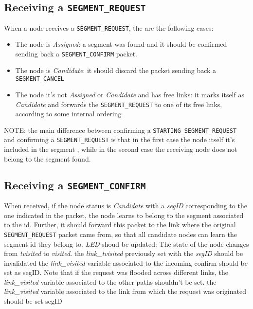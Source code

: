 \subsection{Receiving a \texttt{SEGMENT\_REQUEST}}
When a node receives a \texttt{SEGMENT\_REQUEST}, the are the following cases:

\begin{itemize}
\item The node is \emph{Assigned}: a segment was
found and it should be confirmed sending back a \texttt{SEGMENT\_CONFIRM}
packet.  
\item The node is \emph{Candidate}: it should discard the packet sending
back a \texttt{SEGMENT\_CANCEL} 
\item The node it's not \emph{Assigned} or \emph{Candidate} and has free
links: it marks itself as \emph{Candidate} and forwards the \texttt{SEGMENT\_REQUEST}
to one of its free links, according to some internal ordering
\end{itemize}

NOTE: the main difference between confirming a \texttt{STARTING\_SEGMENT\_REQUEST}
and confirming a \texttt{SEGMENT\_REQUEST} is that in the first case the node
itself it's included in the segment , while in the second case the
receiving node does not belong to the segment found. 


\subsection{Receiving a \texttt{SEGMENT\_CONFIRM}}
When received, if the node status is \emph{Candidate} with a \emph{segID} corresponding to the one indicated in
the packet, the node learns to belong to the segment associated to the
id. Further, it should forward this packet to the link where the
original \texttt{SEGMENT\_REQUEST} packet came from, so that all candidate nodes
can learn the segment id they belong to.  \emph{LED} shoud be
updated: The state of the node changes from \emph{tvisited} to \emph{visited}.  the
\emph{link\_tvisited} previously set with the \emph{segID} should be invalidated the
\emph{link\_visited} variable associated to the incoming confirm should be set
as segID. Note that if the request was flooded across different links,
the \emph{link\_visited} variable associated to the other paths shouldn’t be
set.  the \emph{link\_visited} variable associated to the link from which the
request was originated should be set segID

